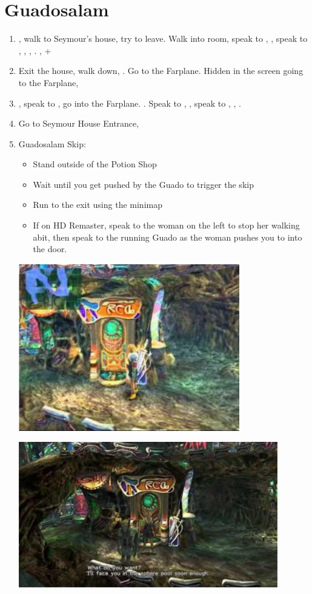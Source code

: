 \chapter{Guadosalam}

\begin{enumerate}
	\item \sd, walk to Seymour's house, try to leave. Walk into room, speak to \auron, \sd, speak to \lulu, \wakka, \rikku, \yuna. \sd, \fmv+\cs[5:50]
	\item Exit the house, walk down, \sd. Go to the Farplane. Hidden in the screen going to the Farplane, 
	\item \sd, speak to \auron, go into the Farplane. \cs[1:20]. Speak to \wakka, \sd, speak to \yuna, \cs[2:10], \sd.
	\item Go to Seymour House Entrance, \sd
	\item Guadosalam Skip:
	\begin{itemize}
		\item Stand outside of the Potion Shop
		\item Wait until you get pushed by the Guado to trigger the skip
		\item Run to the exit using the minimap
		\item If on HD Remaster, speak to the woman on the left to stop her walking abit, then speak to the running Guado as the woman pushes you to into the door.
	\end{itemize}
	\includegraphics{graphics/guadoskipstandard}

	\includegraphics{graphics/guadoskipremaster}
\end{enumerate}
